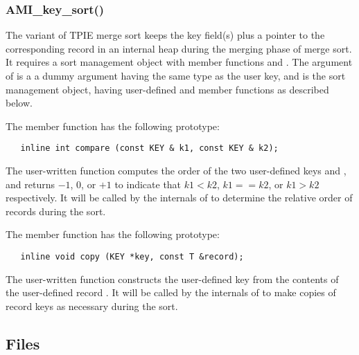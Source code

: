 
\subsubsection{AMI\_key\_sort()}

The  variant of TPIE merge sort keeps
the key field(s) plus a pointer to the corresponding record
in an internal heap during the merging phase of merge sort.
It requires a sort management object with member functions
 and .
The  argument of  is a a
dummy argument having the same type as the user key, and
 is the sort management
object, having user-defined  and
 member functions as described below.

The  member function has the following
prototype:
\begin{verbatim}
   inline int compare (const KEY & k1, const KEY & k2);
\end{verbatim}

The user-written  function computes the
order of the two user-defined keys  and
, and returns $-1$, $0$, or $+1$ to indicate that
$k1<k2$, $k1==k2$, or $k1>k2$ respectively.
It will be called by the internals of  to
determine the relative order of records during the sort.

The  member function has the following
prototype:
\begin{verbatim}
   inline void copy (KEY *key, const T &record);
\end{verbatim}

The user-written  function constructs the
user-defined key  from the contents of the
user-defined record . It will be called by the
internals of  to make copies of record
keys as necessary during the sort.



\subsection{Files}
  \btabb
         {}
  \etabb

